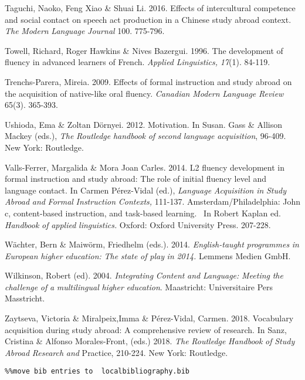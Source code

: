 Taguchi, Naoko, Feng Xiao \& Shuai Li. 2016. Effects of intercultural competence and social contact on speech act production in a Chinese study abroad context. \textit{The} \textit{Modern} \textit{Language} \textit{Journal} 100. 775-796.

Towell, Richard, Roger Hawkins \& Nives Bazergui. 1996. The development of fluency in advanced learners of French. \textit{Applied} \textit{Linguistics,} \textit{17}(1). 84-119. 

Trenchs-Parera, Mireia. 2009. Effects of formal instruction and study abroad on the acquisition of native-like oral fluency. \textit{Canadian} \textit{Modern} \textit{Language} \textit{Review} 65(3). 365-393.

Ushioda, Ema \& Zoltan Dörnyei. 2012. Motivation. In Susan. Gass \& Allison Mackey (eds.), \emph{The} \emph{Routledge} \emph{handbook} \emph{of} \emph{second} \emph{language} \emph{acquisition}{,} 96-409. New York: Routledge.

Valls-Ferrer, Margalida \& Mora Joan Carles. 2014. L2 fluency development in formal instruction and study abroad: The role of initial fluency level and language contact. In Carmen Pérez-Vidal (ed.), \textit{Language} \textit{Acquisition} \textit{in} \textit{Study} \textit{Abroad} \textit{and} \textit{Formal} \textit{Instruction} \textit{Contexts,} 111-137. Amsterdam/Philadelphia: John c, content-based instruction, and task-based learning. ~In Robert Kaplan ed. \textit{Handbook} \textit{of} \textit{applied} \textit{linguistics.} Oxford: Oxford University Press. 207-228.

Wächter, Bern \& Maiwörm, Friedhelm (eds.).  2014. \textit{English-taught} \textit{programmes} \textit{in} \textit{European} \textit{higher} \textit{education:} \textit{The} \textit{state} \textit{of} \textit{play} \textit{in} \textit{2014.} Lemmens Medien GmbH.

Wilkinson, Robert (ed). 2004. \textit{Integrating} \textit{Content} \textit{and} \textit{Language:} \textit{Meeting} \textit{the} \textit{challenge} \textit{of} \textit{a} \textit{multilingual} \textit{higher} \textit{education}. Maastricht: Universitaire Pers Masstricht. 

Zaytseva, Victoria \& Miralpeix,Imma \& Pérez-Vidal, Carmen. 2018. Vocabulary acquisition during study abroad: A comprehensive review of research. In Sanz, Cristina \& Alfonso Morales-Front, (eds.) 2018. \textit{The} \textit{Routledge} \textit{Handbook} \textit{of} \textit{Study} \textit{Abroad} \textit{Research} \textit{and} Practice, 210-224. New York: Routledge. 


\begin{verbatim}%%move bib entries to  localbibliography.bib
\end{verbatim}